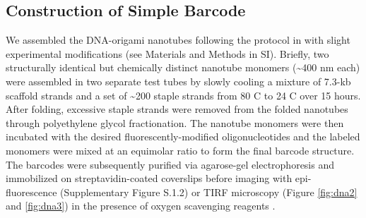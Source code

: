 \subsection{Construction of Simple Barcode}
We assembled the DNA-origami nanotubes following the protocol in \citep{douglas_dna-nanotube-induced_2007} with slight experimental modifications (see Materials and Methods in SI). 
Briefly, two structurally identical but chemically distinct nanotube monomers (\textasciitilde400 nm 
each) were assembled in two separate test tubes by slowly cooling a mixture of 7.3-kb 
scaffold strands and a set of \textasciitilde200 staple strands from 80 \textdegree C to 24 \textdegree C over 15 hours. After 
folding, excessive staple strands were removed from the folded nanotubes through 
polyethylene glycol fractionation. The nanotube monomers were then incubated with the 
desired fluorescently-modified oligonucleotides and the labeled monomers were mixed at 
an equimolar ratio to form the final barcode structure. The barcodes were subsequently 
purified via agarose-gel electrophoresis and immobilized on streptavidin-coated 
coverslips before imaging with epi-fluorescence (Supplementary Figure S.1.2) or TIRF microscopy (Figure 
\ref{fig:dna2} and \ref{fig:dna3}) in the presence of oxygen scavenging reagents \citep{liedl_self-assembly_2010}. 

